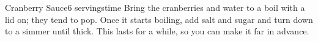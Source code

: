 \documentclass[../Cookbook.tex]{subfiles}
\begin{document}
\begin{recipe}[CranberrySauce]{Cranberry Sauce}{6 servings}{time}
Bring the cranberries and water to a boil with a lid on; they tend to pop. Once it starts boiling, add salt and sugar and turn down to a simmer until thick. This lasts for a while, so you can make it far in advance.
\end{recipe}
\end{document}
